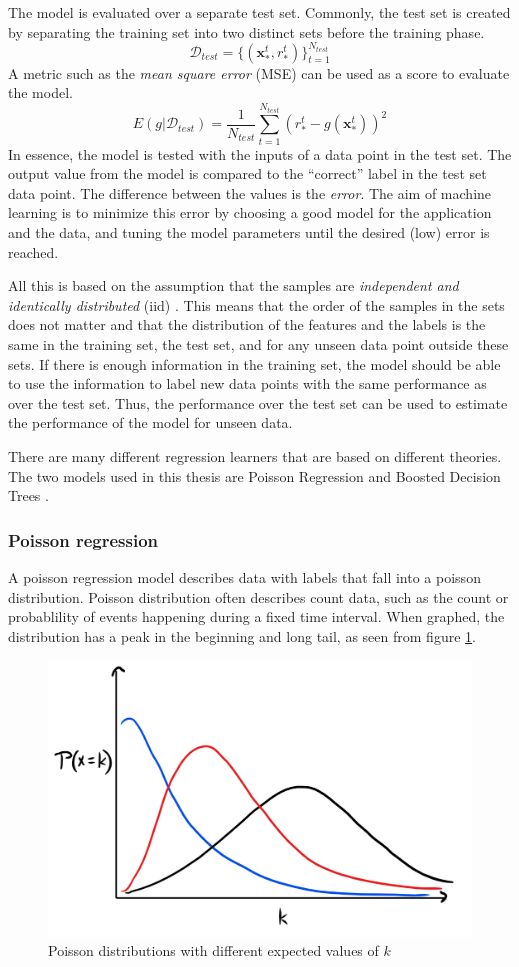 The model is evaluated over a separate test set.
Commonly, the test set is created by separating the training set into two distinct sets before the training phase.
$$\mathcal{D}_{test} = \{ (\mathbf{x}_*^t , r_*^t) \}_{t=1}^{N_{test}}$$
A metric such as the \emph{mean square error} (MSE) can be used as a score to evaluate the model. \cite{alpaydin}
$$E(g | \mathcal{D}_{test}) = \frac{1}{N_{test}} \sum_{t=1}^{N_{test}} (r_*^t - g(\mathbf{x}_*^t))^2$$
In essence, the model is tested with the inputs of a data point in the test set. The output value from the model is compared to the ``correct'' label in the test set data point.
The difference between the values is the \emph{error}.
The aim of machine learning is to minimize this error by choosing a good model for the application and the data, and tuning the model parameters until the desired (low) error is reached.

All this is based on the assumption that the samples are \textit{independent and identically distributed} (iid) \cite{alpaydin}.
This means that the order of the samples in the sets does not matter and that the distribution of the features and the labels is the same in the training set, the test set, and for any unseen data point outside these sets.
If there is enough information in the training set, the model should be able to use the information to label new data points with the same performance as over the test set.
Thus, the performance over the test set can be used to estimate the performance of the model for unseen data.

There are many different regression learners that are based on different theories. The two models used in this thesis are Poisson Regression \cite{azurepoisson} and Boosted Decision Trees \cite{azurebdt}.

\subsubsection{Poisson regression}

A poisson regression model describes data with labels that fall into a poisson distribution.
Poisson distribution often describes count data, such as the count or probablility of events happening during a fixed time interval. \cite{osgood2000poisson}
When graphed, the distribution has a peak in the beginning and long tail, as seen from figure \ref{fig:poissongraphs}.

\begin{figure}[htb]
\centering \includegraphics[width=0.6\linewidth]{gfx/figures/poissongraphs.png}
\caption{Poisson distributions with different expected values of $k$}
\label{fig:poissongraphs}
\end{figure}

